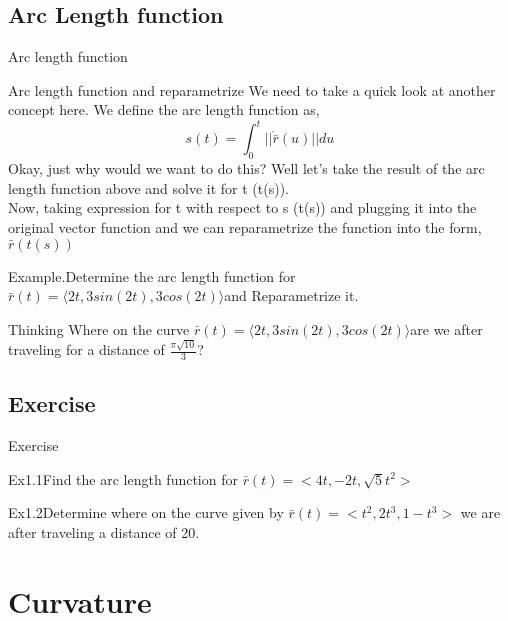 \documentclass[aspectratio=169, UTF8]{ctexbeamer}
\begin{document}
    \subsection{Arc Length function}
    \begin{frame}[t]{Arc length function}
        \begin{block}{Arc length function and reparametrize}
            We need to take a quick look at another concept here. We define the arc length function as,
            \begin{equation*}
                s(t) = \int_{0}^{t}{||\dot{\bar{r}}(u)||du}
            \end{equation*}
            Okay, just why would we want to do this? Well let’s take the result of the arc length function above and solve it for t (t(s)).\\
            Now, taking expression for t with respect to s (t(s)) and plugging it into the original vector function and we can \textcolor{yy}{reparametrize} the function into the form, $\bar{r}(t(s))$
        \end{block}
        \par \textcolor{yy}{Example.}Determine the arc length function for $\bar{r}(t)=⟨2t,3sin(2t),3cos(2t)⟩$and Reparametrize it.\\
        \par \textcolor{yy}{Thinking} Where on the curve $\bar{r}(t)=⟨2t,3sin(2t),3cos(2t)⟩$are we after traveling for a distance of $\frac{\pi\sqrt{10}}{3}$?
    \end{frame}

    
\subsection{Exercise}
    \begin{frame}[t]{Exercise}
    \par \textcolor{yy}{Ex1.1}Find the arc length function for $\bar{r}(t) = <4t,-2t,\sqrt{5}t^2>$
    \par \textcolor{yy}{Ex1.2}Determine where on the curve given by $\bar{r}(t) = <t^2,2t^3,1-t^3>$ we are after traveling a distance of 20.
       
    \end{frame}



\section{Curvature}
    
\end{document}
